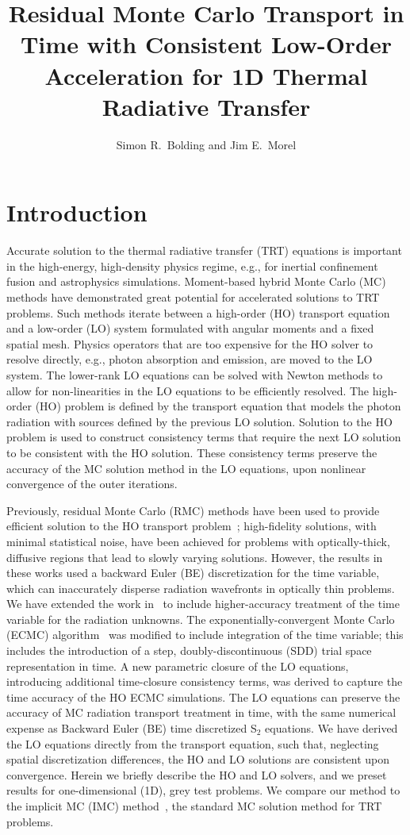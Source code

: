 \documentclass{anstrans}
\title{Residual Monte Carlo Transport in Time with Consistent Low-Order Acceleration for
    1D Thermal Radiative Transfer}
\author{Simon R.~Bolding and Jim E.~Morel}
\institute{Texas A\&M University Nuclear Engineering Department, 
}
\begin{document}
\section{Introduction}

Accurate solution to the thermal radiative transfer (TRT) equations is important in the
high-energy, high-density physics regime, e.g., for inertial
confinement fusion and astrophysics simulations.  Moment-based hybrid Monte Carlo (MC)
methods have demonstrated great potential for accelerated
solutions to TRT problems.   Such methods iterate between a
high-order (HO) transport equation and a low-order (LO) system formulated with angular moments
and a fixed spatial mesh.  Physics operators that
are too expensive for the HO solver to resolve directly, e.g., photon absorption and emission,
are moved to the LO system. The lower-rank LO equations can be solved with Newton
methods to allow for non-linearities in the LO equations to be efficiently
resolved.  The high-order (HO) problem is defined by the transport equation
that models the photon radiation with sources defined by the previous LO solution. Solution to the HO
problem is used to construct consistency terms that require the next LO solution to be
consistent with the HO solution.  These consistency terms preserve the accuracy of the MC
solution method in the LO equations, upon nonlinear convergence of the outer iterations.

Previously, residual Monte Carlo (RMC) methods have been used to provide efficient
solution to the HO transport problem~\cite{rmc,bolding_nse}; high-fidelity solutions,
with minimal statistical noise, have been achieved for problems with optically-thick, diffusive
regions that lead to slowly varying
solutions.  However, the results in these works used a backward
Euler (BE) discretization for the time variable, which can inaccurately disperse radiation
wavefronts in optically thin problems. We have extended the work
in~\cite{bolding_nse} to include higher-accuracy treatment of the time variable for the
radiation unknowns. The exponentially-convergent Monte Carlo (ECMC)
algorithm~\cite{bolding_nse} was modified to include integration of the time variable;
this includes the introduction of a step, doubly-discontinuous (SDD) trial space representation
in time.  A new
parametric closure of the LO equations, introducing additional time-closure consistency
terms, was derived to capture the time accuracy of the HO
ECMC simulations.  The LO equations can preserve the accuracy of MC radiation transport treatment in
time, with the same numerical expense as Backward Euler (BE) time discretized S$_2$ equations. We have derived the LO equations directly from the transport equation,
such that, neglecting spatial discretization differences,
the HO and LO solutions are consistent upon convergence.
Herein we briefly describe the HO and LO solvers, and we preset results for
one-dimensional (1D), grey test problems.  We compare our method to the implicit MC
(IMC) method~\cite{wollaber_review}, the standard MC solution
method for TRT problems.
\end{document}
